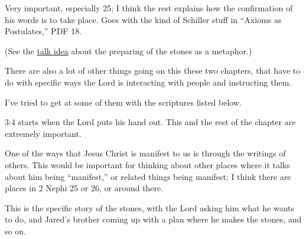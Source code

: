 \begin{compactdesc}
			\item[{\hyperref[MORMON-8-14]{Mormon 8:14--17}}]
			\item[{\hyperref[MORMON-8-34]{Mormon 8:34--36}}]
			\item[{\hyperref[MORMON-9-7]{Mormon 9:7--9}}]
			\item[{\hyperref[MORMON-9-21]{Mormon 9:21}}]
			\item[{\hyperref[MORMON-9-25]{Mormon 9:25--}}] \phantom{.}
				\begin{compactitem}
					\item Very important, especially 25; I think the rest explains how the confirmation of his words is to take place. Goes with the kind of Schiller stuff in ``Axioms as Postulates,'' PDF 18.
				\end{compactitem}
			\item[{\hyperref[ETHER-2]{Ether 2--3}}] (See the \hyperref[TALKIDEAS]{talk idea} about the preparing of the stones as a metaphor.)
				\begin{compactitem}
					\item There are also a lot of other things going on this these two chapters, that have to do with specific ways the Lord is interacting with people and instructing them.
					\item I've tried to get at some of them with the scriptures listed below.
					\item 3:4 starts when the Lord puts his hand out. This and the rest of the chapter are extremely important.
				\end{compactitem}
			\item[{\hyperref[ETHER-2-12]{Ether 2:12}}] \phantom{.}
				\begin{compactitem}
					\item One of the ways that Jesus Christ is manifest to us is through the writings of others. This would be important for thinking about other places where it talks about him being ``manifest,'' or related things being manifest; I think there are places in 2 Nephi 25 or 26, or around there.
				\end{compactitem}
			\item[{\hyperref[ETHER-2-13]{Ether 2:13--15}}]
			\item[{\hyperref[ETHER-2-25]{Ether 2:25--3:}}] \phantom{.}
				\begin{compactitem}
					\item This is the specific story of the stones, with the Lord asking him what he wants to do, and Jared's brother coming up with a plan where he makes the stones, and so on.

\end{compactitem}
\end{compactdesc}
